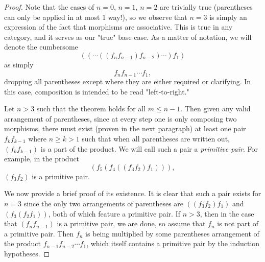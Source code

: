 \documentclass{article}
\theoremstyle{definition}
\begin{document}
\begin{proof}
	Note that the cases of $n = 0$, $n = 1$, $n = 2$ are trivially true (parentheses can only be applied in at most 1 way!), so we observe that $n = 3$ is simply an expression of the fact that morphisms are associative.
	This is true in any category, and it serves as our "true" base case.
	As a matter of notation, we will denote the cumbersome \begin{equation*}
		((\cdots((f_nf_{n-1})f_{n-2})\cdots)f_1)
	\end{equation*}
	as simply \begin{equation*}
		f_n f_{n-1} \cdots f_1,
	\end{equation*}
	dropping all parentheses except where they are either required or clarifying.
	In this case, composition is intended to be read "left-to-right."

	Let $n > 3$ such that the theorem holds for all $m \leq n - 1$.
	Then given any valid arrangement of parentheses, since at every step one is only composing two morphisms, there must exist (proven in the next paragraph) at least one pair $f_kf_{k - 1}$ where $n \geq k > 1$ such that when all parentheses are written out, $(f_kf_{k-1})$ is a part of the product.
	We will call such a pair a \textit{primitive pair}.
	For example, in the product \begin{equation*}
		(f_5(f_4((f_3f_2)f_1))),
	\end{equation*}
	$(f_3f_2)$ is a primitive pair.

	We now provide a brief proof of its existence.
	It is clear that such a pair exists for $n = 3$ since the only two arrangements of parentheses are $((f_3f_2)f_1)$ and $(f_3(f_2f_1))$, both of which feature a primitive pair.
	If $n > 3$, then in the case that $(f_nf_{n-1})$ is a primitive pair, we are done, so assume that $f_n$ is not part of a primitive pair.
	Then $f_n$ is being multiplied by some parentheses arrangement of the product $f_{n-1}f_{n-2}\cdots f_1$, which itself contains a primitive pair by the induction hypotheses.


\end{proof}
\end{document}
